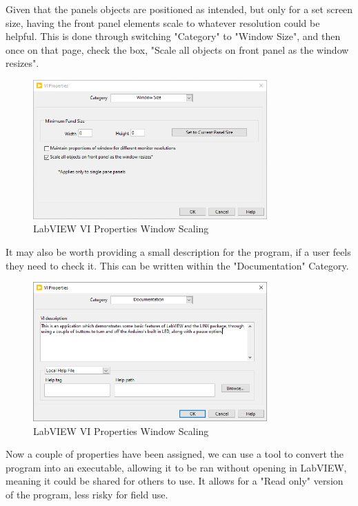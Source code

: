 \documentclass[a4paper,11pt]{report}
\begin{document}
Given that the panels objects are positioned as intended, but only for a set screen size, having the front panel elements scale to whatever resolution could be helpful. This is done through switching "Category" to "Window Size", and then once on that page, check the box, "Scale all objects on front panel as the window resizes".

\begin{figure}[H]
\centering
\includegraphics[width=0.8\textwidth]{screenshots/labview37}
\caption{LabVIEW VI Properties Window Scaling}
\end{figure}

It may also be worth providing a small description for the program, if a user feels they need to check it. This can be written within the "Documentation" Category.

\begin{figure}[H]
\centering
\includegraphics[width=0.8\textwidth]{screenshots/labview38}
\caption{LabVIEW VI Properties Window Scaling}
\end{figure}

Now a couple of properties have been assigned, we can use a tool to convert the program into an executable, allowing it to be ran without opening in LabVIEW, meaning it could be shared for others to use. It allows for a "Read only" version of the program, less risky for field use.
\end{document}
